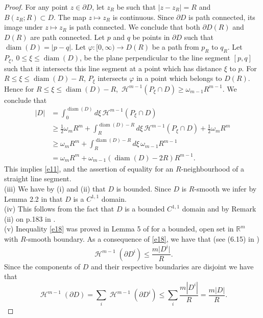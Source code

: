 \documentclass[a4paper,9pt]{amsart}
\begin{document}
\begin{proof}
For any point $z\in\partial D$, let $z_R$ be such that $\vert z -
z_R \vert =R$ and $B(z_R;R)\subset D$. The map $z\mapsto z_R$ is
continuous. Since $\partial D$ is path connected, its image under
$z\mapsto z_R$ is path connected. We conclude that both $\partial
D(R)$ and $D(R)$ are path connected. Let $p$ and $q$ be points in
$\partial D$ such that $\operatorname{diam} (D)=\vert p - q \vert$. Let
$\varphi:[0,\infty)\rightarrow D(R)$ be a path from $p_R$ to
$q_R$. Let $P_{\xi},\ 0 \leq \xi \leq \operatorname{diam} (D)$, be the plane
perpendicular to the line segment $[p,q]$ such that it intersects
this line segment at a point which has distance $\xi$ to $p$. For
$R \leq \xi \leq \operatorname{diam} (D)-R$, $P_{\xi}$ intersects $\varphi$ in a
point which belongs to $D(R)$. Hence for $R \leq \xi \leq
\operatorname{diam}(D)-R$,\ $\mathcal{H}^{m-1}(P_{\xi}\cap
D)\ge\omega_{m-1}R^{m-1}$. We conclude that
\begin{align*}
\vert D \vert &=\int_0^{\operatorname{diam} (D)} d\xi \,
\mathcal{H}^{m-1}(P_{\xi}\cap
D)\\
&\geq \frac{1}{2}\omega_{m}R^{m} + \int_R^{\operatorname{diam} (D)-R} d\xi \,
\mathcal{H}^{m-1}(P_{\xi}\cap
D)+\frac{1}{2}\omega_{m}R^{m}\\
&\geq \omega_{m}R^{m} + \int_R^{\operatorname{diam} (D)-R} d\xi \,\omega_{m-1}R^{m-1}\\
&=\omega_{m}R^{m} + \omega_{m-1}(\operatorname{diam} (D)-2R)R^{m-1}.
\end{align*}
This implies \eqref{e11}, and the assertion of equality for an
$R$-neighbourhood of a straight line segment.\\
\noindent (iii) We have by (i) and (ii) that $D$ is bounded. Since $D$ is $R$-smooth we infer by Lemma 2.2 in \cite{AKSZ} that $D$ is a $C^{1,1}$ domain.\\
\noindent (iv) This follows from the fact that $D$ is a bounded $C^{1,1}$ domain and by Remark (ii) on p.183 in \cite{EG92}.\\
\noindent (v) Inequality \eqref{e18} was proved in Lemma 5 of
\cite{mvdB87} for a bounded, open set in ${\mathbb{R}}^{m}$ with $R$-smooth
boundary. As a consequence of \eqref{e18}, we have that (see
(6.15) in \cite{vdBD89})
\begin{equation*}
\operatorname{\mathcal{H}}^{m-1}(\partial D^{i}) \leq \frac{m \vert D^{i} \vert}{R}.
\end{equation*}
Since the components of $D$ and their respective boundaries are disjoint we have that
\begin{equation}\label{e19b}
\operatorname{\mathcal{H}}^{m-1}(\partial D)=\sum_i \operatorname{\mathcal{H}}^{m-1}(\partial
D^i)\le \sum_i\frac{m|D^i|}{R}=\frac{m|D|}{R}.
\end{equation}
\end{proof}
\end{document}
